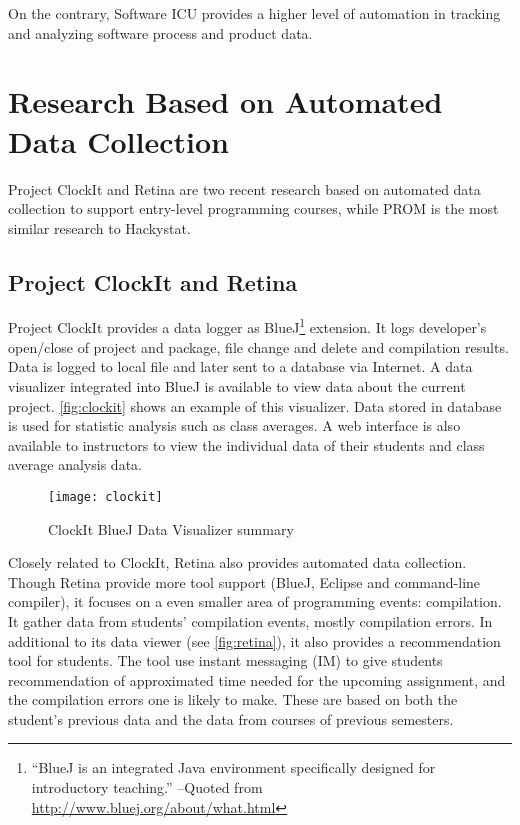 On the contrary, Software ICU provides a higher level of automation in tracking and analyzing software process and product data.


\section {Research Based on Automated Data Collection}
Project ClockIt and Retina are two recent research based on automated data collection to support entry-level programming courses, while PROM is the most similar research to Hackystat.

\subsection {Project ClockIt and Retina}
Project ClockIt provides a data logger as BlueJ\footnote{``BlueJ is an integrated Java environment specifically designed for introductory teaching.'' --Quoted from \url{http://www.bluej.org/about/what.html}}
 extension. It logs developer's open/close of project and package, file change and delete and compilation results. Data is logged to local file and later sent to a database via Internet. A data visualizer integrated into BlueJ is available to view data about the current project. \autoref{fig:clockit} shows an example of this visualizer. Data stored in database is used for statistic analysis such as class averages. A web interface is also available to instructors to view the individual data of their students and class average analysis data.

\begin{figure}[htbp] %
   \centering
   \texttt{[image: clockit]} 
   \caption{ClockIt BlueJ Data Visualizer summary}
   \label{fig:clockit}
\end{figure}

Closely related to ClockIt, Retina also provides automated data collection. Though Retina provide more tool support (BlueJ, Eclipse and command-line compiler), it focuses on a even smaller area of programming events: compilation. It gather data from students' compilation events, mostly compilation errors. In additional to its data viewer (see \autoref{fig:retina}), it also provides a recommendation tool for students. The tool use instant messaging (IM) to give students recommendation of approximated time needed for the upcoming assignment, and the compilation errors one is likely to make. These are based on both the student's previous data and the data from courses of previous semesters. 

